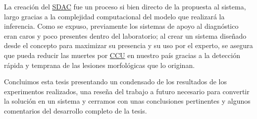 La creación del \hyperlink{abbr}{SDAC} fue un proceso si bien directo de la
propuesta al sistema, largo gracias a la complejidad computacional del modelo
que realizará la inferencia. Como se expuso, previamente los sistemas de apoyo
al diagnóstico eran caros y poco presentes dentro del laboratorio; al crear un
sistema diseñado desde el concepto para maximizar su presencia y su uso por el
experto, se asegura que pueda reducir las muertes por \hyperlink{abbr}{CCU} en
nuestro país gracias a la detección rápida y temprana de las lesiones
morfológicas que lo originan. 

Concluimos esta tesis presentando un condensado de los resultados de los
experimentos realizados, una reseña del trabajo a futuro necesario para
convertir la solución en un sistema y cerramos con unas conclusiones pertinentes
y algunos comentarios del desarrollo completo de la tesis.